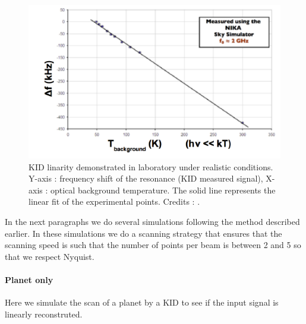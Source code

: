 \begin{figure}[h]
\center
	\includegraphics[scale=0.55]{Figures/KID-linearity-Monfardini2014.png}
	\caption{KID linarity demonstrated in laboratory under realistic conditions. Y-axis : frequency shift of the resonance (KID measured signal), X-axis : optical background temperature. The solid line represents the linear fit of the experimental points. Credits : \citet{2014JLTP..176..787M}.}
	\label{KID-lin}
\end{figure}

In the next paragraphs we do several simulations following the method described earlier. In these simulations we do a scanning strategy that ensures that the scanning speed is such that the number of points per beam is between 2 and 5 so that we respect Nyquist.

\paragraph{Planet only \\}

Here we simulate the scan of a planet by a KID to see if the input signal is linearly reconstruted.

